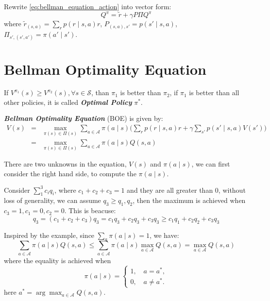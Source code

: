 \documentclass[10pt]{elegantbook}
\newcommand{\mydefination}[1]{\textbf{\textit{\textcolor{structurecolor}{#1}}}}
\begin{document}
Rewrite \ref{eq:bellman_equation_action} into vector form:
\begin{equation}
    Q^{\pi} = \tilde r + \gamma P \Pi Q^{\pi}
\end{equation}
where $\tilde r_{(s,a)} = \sum_r p(r \mid s, a)r$, 
$P_{(s, a), s'} = p(s' \mid s, a)$, $\Pi_{s', (s', a')} = \pi(a' \mid s')$.

\section{Bellman Optimality Equation}
\begin{definition}
    If $V^{\pi_1}(s) \geq V^{\pi_2}(s), \forall s \in \mathcal S$, than $\pi_1$ is better than $\pi_2$, if $\pi_1$ is better than all other policies, 
it is called \mydefination{Optimal Policy} $\pi^*$.
\end{definition}

\mydefination{Bellman Optimality Equation} (BOE) is given by:
\begin{equation} \label{eq:bellman_optimality_equation}
    \begin{array}{lll}
    V(s) &=& \max_{\pi(s) \in \Pi(s)} \sum_{a \in \mathcal A}\pi(a\mid s) \big ( \sum_r p(r \mid s, a) r + \gamma \sum_{s'}p(s' \mid s, a)V(s') \big ) \\
         &=& \max_{\pi(s) \in \Pi(s)} \sum_{a \in \mathcal A}\pi(a\mid s) Q(s, a)
    \end{array}
\end{equation}

There are two unknowns in the equation, $V(s)$ and $\pi(a \mid s)$, we can first consider the right hand side, to compute the $\pi(a \mid s)$.
\begin{example}
    Consider $\sum_{1}^{3} c_i q_i$, where $c_1 + c_2 + c_3 = 1$ and they are all greater than 0, without loss of generality, we can assume $q_3 \geq q_1, q_2$, 
    then the maximum is achieved when $c_3 = 1, c_1 = 0, c_2 = 0$. This is beacuse:
    \[ q_3 = (c_1 + c_2 + c_3)q_3 = c_1 q_3 + c_2 q_3 + c_3 q_3 \geq c_1 q_1 + c_2 q_2 + c_3 q_3 \]
\end{example}

Inspired by the example, since $\sum_a \pi(a \mid s) = 1$, we have:
\[ \sum_{a \in \mathcal A}\pi(a \mid s) Q(s, a) \leq \sum_{a \in \mathcal A}\pi(a \mid s)\max_{a \in \mathcal A} Q(s, a) = \max_{a \in \mathcal A} Q(s, a) \]
where the equality is achieved when
\[
\pi(a \mid s) = \left \{ 
\begin{array}{l}
    1, \quad a = a^*, \\
    0, \quad a \neq a^*.
\end{array} \right .
\]
here $a^* = \arg\max_{a \in \mathcal A} Q(s, a)$.
\end{document}

